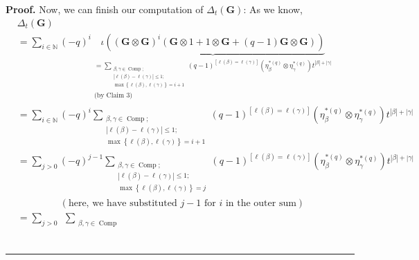 \documentclass[numbers=enddot,12pt,final,onecolumn,notitlepage]{scrartcl}%
\theoremstyle{definition}
\newenvironment{proof}[1][Proof]{\noindent\textbf{#1.} }{\ \rule{0.5em}{0.5em}}
\let\sumnonlimits\sum
\renewcommand{\sum}{\sumnonlimits\limits}
\begin{document}
\begin{proof}
Now, we can finish our computation of $\Delta_{t}\left(  \mathbf{G}\right)  $:
As we know,
\begin{align*}
&  \Delta_{t}\left(  \mathbf{G}\right) \\
&  =\sum_{i\in\mathbb{N}}\left(  -q\right)  ^{i}\underbrace{\iota\left(
\left(  \mathbf{G}\otimes\mathbf{G}\right)  ^{i}\left(  \mathbf{G}%
\otimes1+1\otimes\mathbf{G}+\left(  q-1\right)  \mathbf{G}\otimes
\mathbf{G}\right)  \right)  }_{\substack{=\sum_{\substack{\beta,\gamma
\in\operatorname*{Comp};\\\left\vert \ell\left(  \beta\right)  -\ell\left(
\gamma\right)  \right\vert \leq1;\\\max\left\{  \ell\left(  \beta\right)
,\ell\left(  \gamma\right)  \right\}  =i+1}}\left(  q-1\right)  ^{\left[
\ell\left(  \beta\right)  =\ell\left(  \gamma\right)  \right]  }\left(
\eta_{\beta}^{\ast\left(  q\right)  }\otimes\eta_{\gamma}^{\ast\left(
q\right)  }\right)  t^{\left\vert \beta\right\vert +\left\vert \gamma
\right\vert }\\\text{(by Claim 3)}}}\\
&  =\sum_{i\in\mathbb{N}}\left(  -q\right)  ^{i}\sum_{\substack{\beta
,\gamma\in\operatorname*{Comp};\\\left\vert \ell\left(  \beta\right)
-\ell\left(  \gamma\right)  \right\vert \leq1;\\\max\left\{  \ell\left(
\beta\right)  ,\ell\left(  \gamma\right)  \right\}  =i+1}}\left(  q-1\right)
^{\left[  \ell\left(  \beta\right)  =\ell\left(  \gamma\right)  \right]
}\left(  \eta_{\beta}^{\ast\left(  q\right)  }\otimes\eta_{\gamma}%
^{\ast\left(  q\right)  }\right)  t^{\left\vert \beta\right\vert +\left\vert
\gamma\right\vert }\\
&  =\sum_{j>0}\left(  -q\right)  ^{j-1}\sum_{\substack{\beta,\gamma
\in\operatorname*{Comp};\\\left\vert \ell\left(  \beta\right)  -\ell\left(
\gamma\right)  \right\vert \leq1;\\\max\left\{  \ell\left(  \beta\right)
,\ell\left(  \gamma\right)  \right\}  =j}}\left(  q-1\right)  ^{\left[
\ell\left(  \beta\right)  =\ell\left(  \gamma\right)  \right]  }\left(
\eta_{\beta}^{\ast\left(  q\right)  }\otimes\eta_{\gamma}^{\ast\left(
q\right)  }\right)  t^{\left\vert \beta\right\vert +\left\vert \gamma
\right\vert }\\
&  \ \ \ \ \ \ \ \ \ \ \ \ \ \ \ \ \ \ \ \ \left(  \text{here, we have
substituted }j-1\text{ for }i\text{ in the outer sum}\right) \\
&  =\sum_{j>0}\ \ \sum_{\substack{\beta,\gamma\in\operatorname*{Comp}%
}}
\end{align*}
\end{proof}
\end{document}
